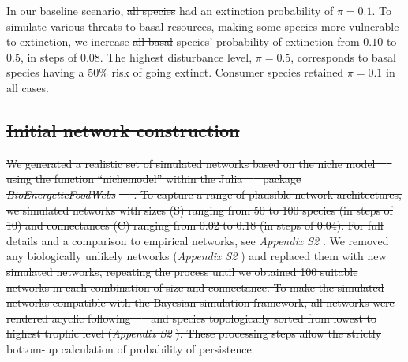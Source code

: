 \documentclass[12pt]{article}
\providecommand{\DIFadd}[1]{{\protect\color{blue}\uwave{#1}}} %
\providecommand{\DIFdel}[1]{{\protect\color{red}\sout{#1}}}                      %
\providecommand{\DIFaddbegin}{} %
\providecommand{\DIFaddend}{} %
\providecommand{\DIFdelbegin}{} %
\providecommand{\DIFdelend}{} %
\newcommand{\DIFscaledelfig}{0.5}
\newlength{\DIFdelgraphicswidth} %
\newlength{\DIFdelgraphicsheight} %
\newcommand{\DIFaddincludegraphics}[2][]{{\color{blue}\fbox{\DIFOincludegraphics[#1]{#2}}}} %
\newcommand{\DIFdelincludegraphics}[2][]{%
\sbox{\DIFdelgraphicsbox}{\DIFOincludegraphics[#1]{#2}}%
\settoboxwidth{\DIFdelgraphicswidth}{\DIFdelgraphicsbox} %
\settoboxtotalheight{\DIFdelgraphicsheight}{\DIFdelgraphicsbox} %
\scalebox{\DIFscaledelfig}{%
\parbox[b]{\DIFdelgraphicswidth}{\usebox{\DIFdelgraphicsbox}\\[-\baselineskip] \rule{\DIFdelgraphicswidth}{0em}}\llap{\resizebox{\DIFdelgraphicswidth}{\DIFdelgraphicsheight}{%
\setlength{\unitlength}{\DIFdelgraphicswidth}%
\begin{picture}(1,1)%
\thicklines\linethickness{2pt} %
{\color[rgb]{1,0,0}\put(0,0){\framebox(1,1){}}}%
{\color[rgb]{1,0,0}\put(0,0){\line( 1,1){1}}}%
{\color[rgb]{1,0,0}\put(0,1){\line(1,-1){1}}}%
\end{picture}%
}\hspace*{3pt}}} %
} %
\DeclareRobustCommand{\DIFaddbegin}{\DIFOaddbegin \let\includegraphics\DIFaddincludegraphics} %
\DeclareRobustCommand{\DIFaddend}{\DIFOaddend \let\includegraphics\DIFOincludegraphics} %
\DeclareRobustCommand{\DIFdelbegin}{\DIFOdelbegin \let\includegraphics\DIFdelincludegraphics} %
\DeclareRobustCommand{\DIFdelend}{\DIFOaddend \let\includegraphics\DIFOincludegraphics} %
\begin{document}
\begin{spacing}{2.0}
\DIFdelend %
        In our baseline scenario, \DIFdelbegin \DIFdel{all species }\DIFdelend \DIFaddbegin \DIFadd{basal resources }\DIFaddend had an extinction probability of $\pi = 0.1$. 
		To simulate various threats to basal resources, making some species more vulnerable to extinction, we increase \DIFdelbegin \DIFdel{all basal }\DIFdelend \DIFaddbegin \DIFadd{the affected }\DIFaddend species' probability of extinction from $0.10$ to $0.5$, in steps of $0.08$. 
		The highest disturbance level, $\pi = 0.5$, corresponds to basal species having a 50\% risk of going extinct. 
		Consumer species retained $\pi=0.1$ in all cases.

		
	\DIFdelbegin \subsection*{\DIFdel{Initial network construction}}

\DIFdel{We generated a realistic set of simulated networks based on the niche model~\mbox{%
\citep{Williams2000,Stouffer2007} }\hspace{0pt}%
using the function ``nichemodel'' within the Julia~\mbox{%
\citep{Bezanson2017julia} }\hspace{0pt}%
package }\emph{\DIFdel{BioEnergeticFoodWebs}}%
\DIFdel{~\mbox{%
\citep{bioenergfw,Delmas2017}}\hspace{0pt}%
. 
		To capture a range of plausible network architectures, we simulated networks with sizes (S) ranging from 50 to 100 species (in steps of 10) and connectances (C) ranging from 0.02 to 0.18 (in steps of 0.04). 
		For full details and a comparison to empirical networks, see }\emph{\DIFdel{Appendix S2}}%
\DIFdel{.
		We removed any biologically unlikely networks (}\emph{\DIFdel{Appendix S2}}%
\DIFdel{) and replaced them with new simulated networks, repeating the process until we obtained 100 suitable networks in each combination of size and connectance.
		To make the simulated networks compatible with the Bayesian simulation framework, all networks were rendered acyclic following~\mbox{%
\citet{Allesina2009functional} }\hspace{0pt}%
and species topologically sorted from lowest to highest trophic level (}\emph{\DIFdel{Appendix S2}}%
\DIFdel{). 
		 These processing steps allow the strictly bottom-up calculation of probability of persistence.
		}%


\end{spacing}
\end{document}
